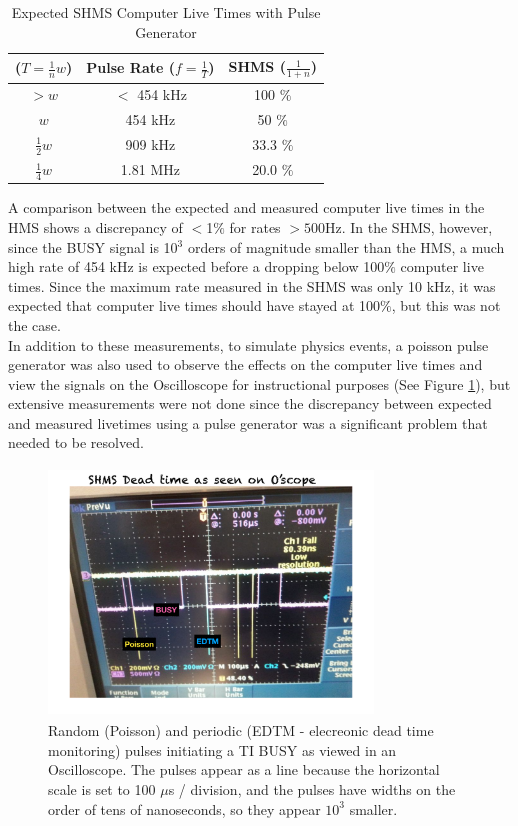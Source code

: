 \documentclass[letterpaper, 12 pt, conference]{ieeeconf}  %
\begin{document}
\begin{table}[ht]
\caption{Expected SHMS Computer Live Times with Pulse Generator}
\centering
{\def\arraystretch{1.6}\tabcolsep=5pt
\begin{tabular}{c c c}
\hline\hline
($T=\frac{1}{n}w$) & Pulse Rate ($f = \frac{1}{T}$) &  SHMS ($\frac{1}{1+n}$) \\ [0.5ex] %
\hline
$>w$             & $<$ 454 kHz & 100 $\%$ \\
$w$              & 454 kHz & 50  $\%$ \\
$\frac{1}{2}w$   & 909 kHz & 33.3 $\%$  \\
$\frac{1}{4}w$   & 1.81 MHz & 20.0 $\%$  \\ [1ex]
\hline
\end{tabular}
}
\label{table:expected_shmscp_LT}
\end{table} 
\indent A comparison between the expected and measured computer live times in the HMS shows a discrepancy of $<$1$\%$ for rates $>500$Hz.
In the SHMS, however, since the BUSY signal is 10$^{3}$ orders of magnitude smaller than the HMS, a much high rate of 454 kHz is
expected before a dropping below 100$\%$ computer live times. Since the maximum rate measured in the SHMS was only 10 kHz, it was
expected that computer live times should have stayed at 100$\%$, but this was not the case. \\
\indent In addition to these measurements, to simulate physics events, a poisson pulse generator was also used to observe the
effects on the computer live times and view the signals on the Oscilloscope for instructional purposes (See Figure \ref{fig:scope_edtm}), but extensive measurements were
not done since the discrepancy between expected and measured livetimes using a pulse generator was a significant problem that needed to be
resolved. 
\begin{figure}[h!]
  \centering
  \includegraphics[width=3.4in, height=2.6in]{edtm/EDTM_Oscope.pdf}
  \caption{Random (Poisson) and periodic (EDTM - elecreonic dead time monitoring) pulses initiating a TI BUSY as viewed in an
    Oscilloscope. The pulses appear as a line because the horizontal scale is set to 100 $\mu$s / division, and the pulses have
  widths on the order of tens of nanoseconds, so they appear $10^{3}$ smaller.}
  \label{fig:scope_edtm}
\end{figure}\\
\end{document}
